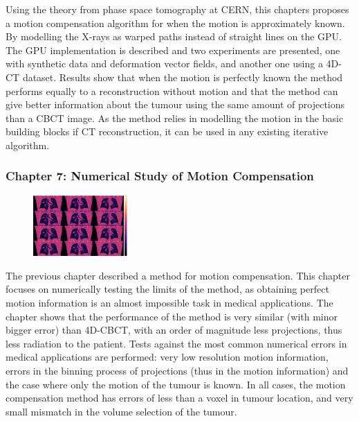Using the theory from phase space tomography at CERN, this chapters proposes a motion compensation algorithm for when the motion is approximately known. By modelling the X-rays as warped paths instead of straight lines on the GPU. The GPU implementation is described and two experiments are presented, one with synthetic data and deformation  vector fields, and another one using a 4D-CT dataset. Results show that when the motion is perfectly known the method performs equally to a reconstruction without motion and that the method can give better information about the tumour using the same amount of projections than a CBCT image. As the method relies in modelling the motion in the basic building blocks if CT reconstruction, it can be used in any existing iterative algorithm.



\newpage
\FloatBarrier
\subsubsection{Chapter 7: Numerical Study of Motion Compensation}

\begin{figure}
\centering
\includegraphics[width=0.32\textwidth]{accuracyMC/4DCBCT3stage.png}
\end{figure}
The previous chapter described a method for motion compensation. This chapter focuses on numerically testing the limits of the method, as obtaining perfect motion information is an almost impossible task in medical applications. The chapter shows that the performance of the method is very similar (with minor bigger error) than 4D-CBCT, with an order of magnitude less projections, thus less radiation to the patient. Tests against the most common numerical errors in medical applications are performed: very low resolution motion information, errors in the binning process of projections (thus in the motion information) and the case where only the motion of the tumour is known. In all cases, the motion compensation method has errors of less than a voxel in tumour location, and very small mismatch in the volume selection of the tumour.




